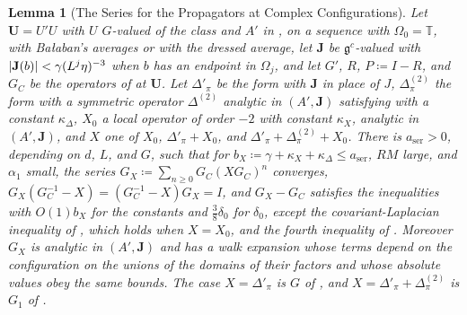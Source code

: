 \documentclass[11pt]{preprint}
\DeclarePairedDelimiter{\abs}{\lvert}{\rvert}
\numberwithin{equation}{section}
\newtheorem{lemma}{Lemma}[section]
\theoremstyle{definition}
\theoremstyle{remark}
\theoremstyle{plain}
\begin{document}
\begin{lemma}[The Series for the Propagators at Complex Configurations]\label{lem:pbg-3130}
Let $\mathbf U = U'U$ with $U$ $G$-valued of the class \cite[(3.35)]{BalabanPBG} and $A'$ in \cite[(3.37)]{BalabanPBG}, on a sequence with $\Omega_0 = \mathbb T$, with Ba{\l}aban's averages or with the dressed average, let $\mathbf J$ be $\mathfrak g^c$-valued with $\abs{\mathbf J(b)} < \gamma(L^j\eta)^{-3}$ when $b$ has an endpoint in $\Omega_j$, and let $G'$, $R$, $P \coloneqq I - R$, and $G_C$ be the operators of \cite[Theorem~3.4]{BalabanPBG} at $\mathbf U$. Let $\Delta'_\pi$ be the form \cite[(3.120)]{BalabanPBG} with $\mathbf J$ in place of $J$, $\Delta^{(2)}_\pi$ the form \cite[(3.135)]{BalabanPBG} with a symmetric operator $\Delta^{(2)}$ analytic in $(A', \mathbf J)$ satisfying \cite[(3.137)]{BalabanPBG} with a constant $\kappa_\Delta$, $X_0$ a local operator of order $-2$ with constant $\kappa_X$, analytic in $(A', \mathbf J)$, and $X$ one of $X_0$, $\Delta'_\pi + X_0$, and $\Delta'_\pi + \Delta^{(2)}_\pi + X_0$. There is $a_{\mathrm{ser}} > 0$, depending on $d$, $L$, and $G$, such that for $b_X \coloneqq \gamma + \kappa_X + \kappa_\Delta \leq a_{\mathrm{ser}}$, $RM$ large, and $\alpha_1$ small, the series $G_X \coloneqq \sum_{n \geq 0}G_C(XG_C)^n$ converges, $G_X(G_C^{-1} - X) = (G_C^{-1} - X)G_X = I$, and $G_X - G_C$ satisfies the inequalities \cite[(3.42)--(3.47)]{BalabanPBG} with $O(1)b_X$ for the constants and $\frac38\delta_0$ for $\delta_0$, except the covariant-Laplacian inequality of \cite[(3.42)]{BalabanPBG}, which holds when $X = X_0$, and the fourth inequality of \cite[(3.47)]{BalabanPBG}. Moreover $G_X$ is analytic in $(A', \mathbf J)$ and has a walk expansion whose terms depend on the configuration on the unions of the domains of their factors and whose absolute values obey the same bounds. The case $X = \Delta'_\pi$ is $G$ of \cite[(3.130)]{BalabanPBG}, and $X = \Delta'_\pi + \Delta^{(2)}_\pi$ is $G_1$ of \cite[(3.138)]{BalabanPBG}.
\end{lemma}
\end{document}
